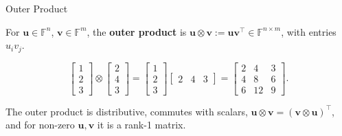 \documentclass{zkdl-presentation-template}
\begin{document}
    \begin{frame}{Outer Product}
        \begin{definition}
            For $\mathbf{u} \in \mathbb{F}^n$, $\mathbf{v} \in \mathbb{F}^m$, the \textbf{outer product} is $\mathbf{u} \otimes \mathbf{v} := \mathbf{u}\mathbf{v}^{\top} \in \mathbb{F}^{n \times m}$, with entries $u_iv_j$.
        \end{definition}
        \pause

        \begin{example}
            \begin{equation*}
                \begin{bmatrix}
                    1 \\ 2 \\ 3
                \end{bmatrix} \otimes \begin{bmatrix}
                    2 \\ 4 \\ 3
                \end{bmatrix} = \begin{bmatrix}
                    1 \\ 2 \\ 3
                \end{bmatrix}\begin{bmatrix}
                    2 & 4 & 3
                \end{bmatrix} = \begin{bmatrix}
                    2 & 4 & 3 \\
                    4 & 8 & 6 \\
                    6 & 12 & 9
                \end{bmatrix}.
            \end{equation*}
        \end{example}
        \pause

        \begin{lemma}
            The outer product is distributive, commutes with scalars, $\mathbf{u} \otimes \mathbf{v} = (\mathbf{v} \otimes \mathbf{u})^{\top}$, and for non-zero $\mathbf{u}, \mathbf{v}$ it is a rank-1 matrix.
        \end{lemma}
    \end{frame}


    \makeclosingframe
\end{document}

